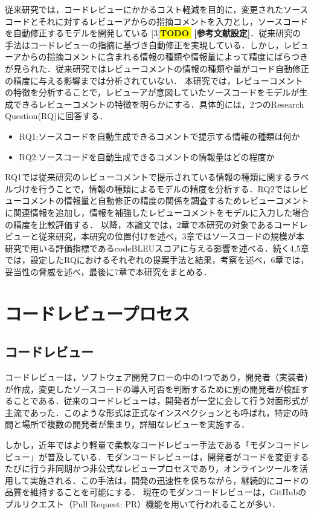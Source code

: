 \documentclass[11pt]{jreport}
\newcommand{\todo}[1]{\colorbox{yellow}{{\bf TODO}:}{\color{red} {\textbf{[#1]}}}}
\newcommand{\RQone}{ソースコードを自動生成できるコメントで提示する情報の種類は何か}
\newcommand{\RQtwo}{ソースコードを自動生成できるコメントの情報量はどの程度か}
\begin{document}
従来研究では，コードレビューにかかるコスト軽減を目的に，変更されたソースコードとそれに対するレビューアからの指摘コメントを入力とし，ソースコードを自動修正するモデルを開発している [3]\todo{参考文献設定}．従来研究の手法はコードレビューの指摘に基づき自動修正を実現している．しかし，レビューアからの指摘コメントに含まれる情報の種類や情報量によって精度にばらつきが見られた．従来研究ではレビューコメントの情報の種類や量がコード自動修正の精度に与える影響までは分析されていない．
本研究では，レビューコメントの特徴を分析することで，レビューアが意図していたソースコードをモデルが生成できるレビューコメントの特徴を明らかにする．具体的には，2つのResearch Question(RQ)に回答する．
\begin{itemize}
\item RQ1:\RQone
\item RQ2:\RQtwo
\end{itemize}
RQ1では従来研究のレビューコメントで提示されている情報の種類に関するラベルづけを行うことで，情報の種類によるモデルの精度を分析する．RQ2ではレビューコメントの情報量と自動修正の精度の関係を調査するためレビューコメントに関連情報を追加し，情報を補強したレビューコメントをモデルに入力した場合の精度を比較評価する．
以降，本論文では，2章で本研究の対象であるコードレビューと従来研究，本研究の位置付けを述べ，3章ではソースコードの規模が本研究で用いる評価指標であるcodeBLEUスコアに与える影響を述べる．続く4,5章では，設定したRQにおけるそれぞれの提案手法と結果，考察を述べ，6章では，妥当性の脅威を述べ，最後に7章で本研究をまとめる．

\chapter{コードレビュープロセス}\label{chap:fig-tab-exp}
\section{コードレビュー}
コードレビューは，ソフトウェア開発フローの中の1つであり，開発者（実装者）が作成，変更したソースコードの導入可否を判断するために別の開発者が検証することである．従来のコードレビューは，開発者が一堂に会して行う対面形式が主流であった．このような形式は正式なインスペクションとも呼ばれ，特定の時間と場所で複数の開発者が集まり，詳細なレビューを実施する．

しかし，近年ではより軽量で柔軟なコードレビュー手法である「モダンコードレビュー」が普及している．モダンコードレビューは，開発者がコードを変更するたびに行う非同期かつ非公式なレビュープロセスであり，オンラインツールを活用して実施される．この手法は，開発の迅速性を保ちながら，継続的にコードの品質を維持することを可能にする．
現在のモダンコードレビューは，GitHubのプルリクエスト（Pull Request: PR）機能を用いて行われることが多い．
\end{document}
